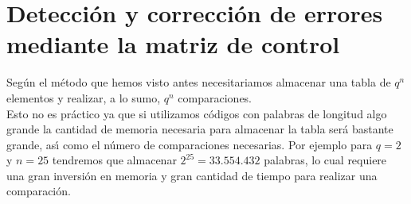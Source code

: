 %
%

\section{Detecci\'on y correcci\'on de errores mediante la matriz de control}

Seg\'un el m\'etodo que hemos visto antes necesitariamos almacenar una tabla
de $q^n$ elementos y realizar, a lo sumo, $q^n$ comparaciones.\\

Esto no es pr\'actico ya que si utilizamos c\'odigos con palabras de longitud
algo grande la cantidad de memoria necesaria para almacenar la tabla ser\'a
bastante grande, as\'{\i} como el n\'umero de comparaciones necesarias. Por
ejemplo para $q=2$ y $n=25$ tendremos que almacenar $2^{25}=33.554.432$
palabras, lo cual requiere una gran inversi\'on en memoria y gran cantidad
de tiempo para realizar una comparaci\'on.\\

